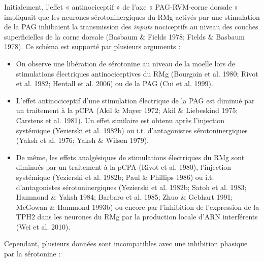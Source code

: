 \documentclass[a4paper,12pt,twoside]{report}
\begin{document}
Initialement, l'effet « antinociceptif » de l’axe « PAG-RVM-corne dorsale » impliquait que les neurones sérotoninergiques du RMg activés par une stimulation de la PAG inhibaient la transmission des \textit{inputs} nociceptifs au niveau des couches superficielles de la corne dorsale (Basbaum \& Fields 1978; Fields \& Basbaum 1978). Ce schéma est supporté par plusieurs arguments :

\begin{itemize}
\item On observe une libération de sérotonine au niveau de la moelle lors de stimulations électriques antinociceptives du RMg (Bourgoin et al. 1980; Rivot et al. 1982; Hentall et al. 2006) ou de la PAG (Cui et al. 1999). 
\item L’effet antinociceptif d’une stimulation électrique de la PAG est diminué par un traitement à la pCPA (Akil \& Mayer 1972; Akil \& Liebeskind 1975; Carstens et al. 1981). Un effet similaire est obtenu après l’injection systémique (Yezierski et al. 1982b) ou i.t. d’antagonistes sérotoninergiques (Yaksh et al. 1976; Yaksh \& Wilson 1979).
\item De même, les effets analgésiques de stimulations électriques du RMg sont diminués par un traitement à la pCPA (Rivot et al. 1980), l’injection systémique (Yezierski et al. 1982b; Paul \& Phillips 1986) ou i.t. d’antagonistes sérotoninergiques (Yezierski et al. 1982b; Satoh et al. 1983; Hammond \& Yaksh 1984; Barbaro et al. 1985; Zhuo \& Gebhart 1991; McGowan \& Hammond 1993b) ou encore par l’inhibition de l’expression de la TPH2 dans les neurones du RMg par la production locale d’ARN interférents (Wei et al. 2010).
\end{itemize}

Cependant, plusieurs données sont incompatibles avec une inhibition phasique par la sérotonine :
\end{document}
